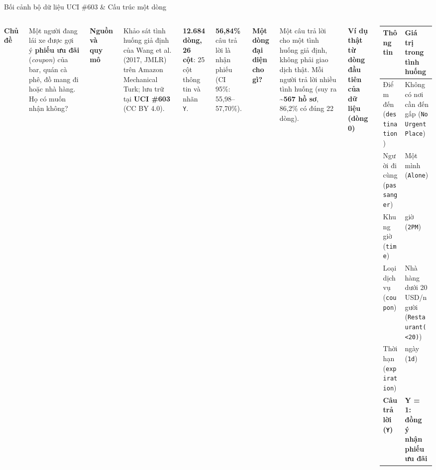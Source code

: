 \documentclass[aspectratio=169,12pt]{beamer}
\newcommand{\SlideOwner}{}
\newcommand{\Owner}[1]{\renewcommand{\SlideOwner}{#1}}
\newcommand{\Block}[2]{%
  {\fontsize{15}{19}\selectfont\bfseries\color{Accent} #1\par}\vspace{1.6mm}
  {\fontsize{13.4}{18}\selectfont\raggedright #2\par}\vspace{4.2mm}}
\newcommand{\Point}[1]{#1\par\vspace{2mm}}
\begin{document}
\Owner{Trần Nhật Dương}
\begin{frame}[t]{Bối cảnh bộ dữ liệu UCI \#603 \& Cấu trúc một dòng}
  \begin{columns}[T,onlytextwidth]
      \Block{Chủ đề}{Một người đang lái xe được gợi ý \textbf{phiếu ưu đãi} (\emph{coupon}) của bar, quán cà phê, đồ mang đi hoặc nhà hàng. Họ có muốn nhận không?}
      \Block{Nguồn và quy mô}{
        \Point{Khảo sát tình huống giả định của Wang et al. (2017, JMLR) trên Amazon Mechanical Turk; lưu trữ tại \textbf{UCI \#603} (CC BY 4.0).}
        \Point{\textbf{12.684 dòng, 26 cột}: 25 cột thông tin và nhãn \texttt{Y}.}
        \textbf{56,84\%} câu trả lời là nhận phiếu (CI 95\%: 55,98–57,70\%).}
      \Block{Một dòng đại diện cho gì?}{Một câu trả lời cho một tình huống giả định, không phải giao dịch thật. Mỗi người trả lời nhiều tình huống (suy ra \textbf{\textasciitilde 567 hồ sơ}, 86,2\% có đúng 22 dòng).}
      {\fontsize{17.5}{22}\selectfont\bfseries Ví dụ thật từ dòng đầu tiên của dữ liệu (dòng 0)\par}
      \vspace{5mm}
      {\fontsize{15.5}{23}\selectfont\renewcommand{\arraystretch}{1.48}
      \begin{tabular}{@{}>{\raggedright\arraybackslash}p{68mm}>{\raggedright\arraybackslash}p{122mm}@{}}
        \toprule
        \textbf{Thông tin} & \textbf{Giá trị trong tình huống}\\ \midrule
        Điểm đến (\texttt{destination}) & Không có nơi cần đến gấp (\texttt{No Urgent Place})\\
        Người đi cùng (\texttt{passanger}) & Một mình (\texttt{Alone})\\
        Khung giờ (\texttt{time}) & 14 giờ (\texttt{2PM})\\
        Loại dịch vụ (\texttt{coupon}) & Nhà hàng dưới 20 USD/người (\texttt{Restaurant(<20)})\\
        Thời hạn (\texttt{expiration}) & 1 ngày (\texttt{1d})\\
        \textbf{Câu trả lời (\texttt{Y})} & \textbf{\color{Accent}Y = 1: đồng ý nhận phiếu ưu đãi}\\
        \bottomrule
      \end{tabular}}
  \end{columns}
\end{frame}
\end{document}
